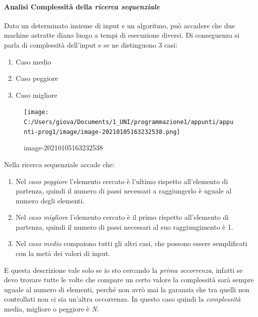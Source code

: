 \documentclass[
  paper=a4,
  oneside  ,captions=tableheading
]{scrbook}
\providecommand{\tightlist}{%
  \setlength{\itemsep}{0pt}\setlength{\parskip}{0pt}}
\begin{document}
\hypertarget{analisi-complessituxe0-della-ricerca-sequenziale}{%
\paragraph{\texorpdfstring{Analisi Complessità della \emph{ricerca
sequenziale}}{Analisi Complessità della ricerca sequenziale}}\label{analisi-complessituxe0-della-ricerca-sequenziale}}

Dato un determinato insieme di input e un algoritmo, può accadere che
due machine astratte diano luogo a tempi di esecuzione diversi. Di
conseguenza si parla di complessità dell'input e se ne distinguono 3
casi:

\begin{enumerate}
\def\labelenumi{\arabic{enumi}.}
\tightlist
\item
  Caso medio
\item
  Caso peggiore
\item
  Caso migliore
\end{enumerate}

\begin{figure}
\centering
\texttt{[image: C:/Users/giova/Documents/1\_UNI/programmazione1/appunti/appunti-prog1/image/image-20210105163232538.png]}
\caption{image-20210105163232538}
\end{figure}

Nella ricerca sequenziale accade che:

\begin{enumerate}
\def\labelenumi{\arabic{enumi}.}
\tightlist
\item
  Nel \emph{caso peggiore} l'elemento cercato è l'ultimo rispetto
  all'elemento di partenza, quindi il numero di passi necessari a
  raggiungerlo è uguale al numero degli elementi.
\item
  Nel \emph{caso migliore} l'elemento cercato è il primo rispetto
  all'elemento di partenza, quindi il numero di passi necessari al suo
  raggiungimento è 1.
\item
  Nel \emph{caso medio} compaiono tutti gli altri casi, che possono
  essere semplificati con la metà dei valori di input.
\end{enumerate}

E questa descrizione vale solo se io sto cercando la \emph{prima
occorrenza}, infatti se devo trovare tutte le volte che compare un certo
valore la complessità sarà sempre uguale al numero di elementi, perché
non avrò mai la garanzia che tra quelli non controllati non ci sia
un'altra occorrenza. In questo caso quindi la \emph{complessità} media,
migliore o peggiore è \emph{N}.
\end{document}
